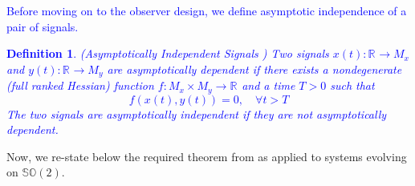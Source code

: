 \documentclass{article}
\newcommand{\SOtwo}{\mathbb{SO}(2)}
\newcommand{\R}[1]{\mathbb{R}^{#1}}
\newtheorem{definition}{Definition}
\newcommand{\textblue}[1]{\textcolor{blue}{#1}}
\begin{document}
\textblue{Before moving on to the observer design, we define asymptotic independence of a pair of signals.}
\textblue{
\begin{definition}(Asymptotically Independent Signals \cite{mahony_complementaryFilter})
Two signals $x(t) : \R{} \to M_x$ and $y(t) : \R{} \to M_y$ are \emph{asymptotically dependent} if there exists a nondegenerate (full ranked Hessian) function $f : M_x\times M_y \to \R{}$ and a time $T>0$ such that \[f(x(t), y(t)) = 0, \quad \forall t > T\]
The two signals are asymptotically independent if they are not asymptotically dependent.      
\end{definition}
}

Now, we re-state below the required theorem from \cite{mahony_complementaryFilter} as applied to systems evolving on $\SOtwo$.
\end{document}
